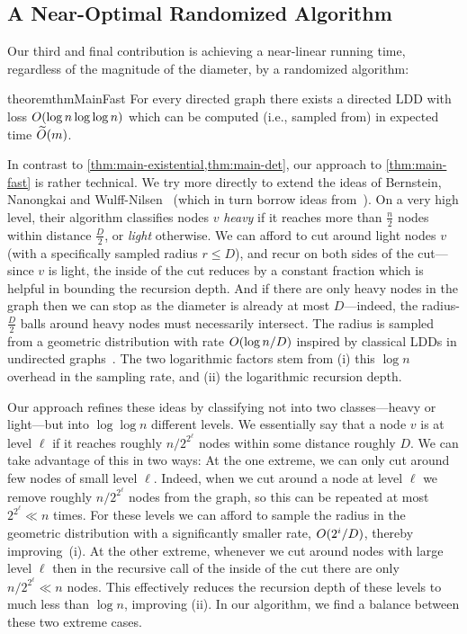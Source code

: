 \subsection{A Near-Optimal Randomized Algorithm} \label{sec:overviewFast}

Our third and final contribution is achieving a near-linear running time, regardless of the magnitude of the diameter, by a randomized algorithm:

\begin{restatable}{theorem}{thmMainFast} \label{thm:main-fast}
	For every directed graph there exists a directed LDD with loss $O(\log n \log\log n)$ which can be computed (i.e., sampled from) in expected time $\widetilde{O}(m)$.
\end{restatable}

In contrast to \cref{thm:main-existential,thm:main-det}, our approach to \cref{thm:main-fast} is rather technical. We try more directly to extend the ideas of Bernstein, Nanongkai and Wulff-Nilsen~\cite{BernsteinNW22} (which in turn borrow ideas from~\cite{BernsteinGW20}). On a very high level, their algorithm classifies nodes $v$ \emph{heavy} if it reaches more than $\frac{n}{2}$ nodes within distance $\frac{D}{2}$, or \emph{light} otherwise. We can afford to cut around light nodes $v$ (with a specifically sampled radius $r \leq D$), and recur on both sides of the cut---since $v$ is light, the inside of the cut reduces by a constant fraction which is helpful in bounding the recursion depth. And if there are only heavy nodes in the graph then we can stop as the diameter is already at most $D$---indeed, the radius-$\frac{D}{2}$ balls around heavy nodes must necessarily intersect. The radius is sampled from a geometric distribution with rate $O(\log n / D)$ inspired by classical LDDs in undirected graphs~\cite{Bartal96}. The two logarithmic factors stem from (i) this $\log n$ overhead in the sampling rate, and (ii) the logarithmic recursion depth.

Our approach refines these ideas by classifying not into two classes---heavy or light---but into $\log\log n$ different levels. We essentially say that a node $v$ is at level $\ell$ if it reaches roughly $n / 2^{2^\ell}$ nodes within some distance roughly $D$. We can take advantage of this in two ways: At the one extreme, we can only cut around few nodes of small level $\ell$. Indeed, when we cut around a node at level $\ell$ we remove roughly $n / 2^{2^\ell}$ nodes from the graph, so this can be repeated at most $2^{2^{\ell}} \ll n$ times. For these levels we can afford to sample the radius in the geometric distribution with a significantly smaller rate, $O(2^i / D)$, thereby improving~(i). At the other extreme, whenever we cut around nodes with large level $\ell$ then in the recursive call of the inside of the cut there are only~$n / 2^{2^\ell} \ll n$ nodes. This effectively reduces the recursion depth of these levels to much less than $\log n$, improving (ii). In our algorithm, we find a balance between these two extreme cases. 

